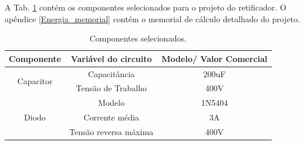 A Tab. \ref{retificador_componentes} contém os componentes selecionados para o projeto do retificador. O apêndice \ref{Energia_memorial} contém o memorial de cálculo detalhado do projeto.

\begin{table}[H]
    \centering
    \caption{Componentes selecionados.}
    \label{retificador_componentes}
    \begin{adjustbox}{max width = \textwidth}
        \begin{tabular}{|c|c|c|}
            \hline
            \rowcolor[HTML]{A8DADC}
            \textbf{Componente} & \textbf{Variável do circuito} & \textbf{Modelo/ Valor Comercial}\\ \hline
            \multirow{2}{*}{Capacitor}& Capacitância & 200uF\\ \cline{2-3} 
            & Tensão de Trabalho & 400V
            \\ \hline 
            \multirow{3}{*}{Diodo}& Modelo & 1N5404 \\ \cline{2-3}
            & Corrente média & 3A \\ \cline{2-3} 
            & Tensão reversa máxima & 400V
             \\ \hline 
        \end{tabular}
    \end{adjustbox}
\end{table}



